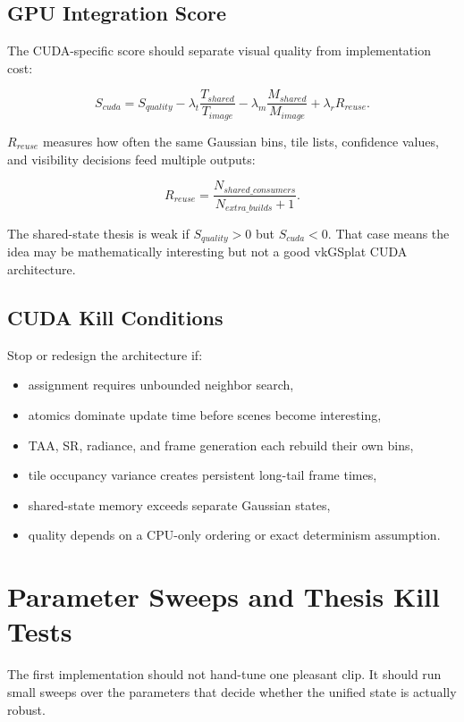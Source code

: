 \documentclass[11pt]{article}
\begin{document}
\subsection{GPU Integration Score}

The CUDA-specific score should separate visual quality from implementation
cost:

\[
  S_{cuda} =
  S_{quality}
  - \lambda_t \frac{T_{shared}}{T_{image}}
  - \lambda_m \frac{M_{shared}}{M_{image}}
  + \lambda_r R_{reuse}.
\]

$R_{reuse}$ measures how often the same Gaussian bins, tile lists, confidence
values, and visibility decisions feed multiple outputs:

\[
  R_{reuse} =
  \frac{
    N_{shared\_consumers}
  }{
    N_{extra\_builds}+1
  }.
\]

The shared-state thesis is weak if $S_{quality}>0$ but $S_{cuda}<0$. That case
means the idea may be mathematically interesting but not a good vkGSplat CUDA
architecture.

\subsection{CUDA Kill Conditions}

Stop or redesign the architecture if:

\begin{itemize}
  \item assignment requires unbounded neighbor search,
  \item atomics dominate update time before scenes become interesting,
  \item TAA, SR, radiance, and frame generation each rebuild their own bins,
  \item tile occupancy variance creates persistent long-tail frame times,
  \item shared-state memory exceeds separate Gaussian states,
  \item quality depends on a CPU-only ordering or exact determinism assumption.
\end{itemize}

\section{Parameter Sweeps and Thesis Kill Tests}

The first implementation should not hand-tune one pleasant clip. It should run
small sweeps over the parameters that decide whether the unified state is
actually robust.
\end{document}
